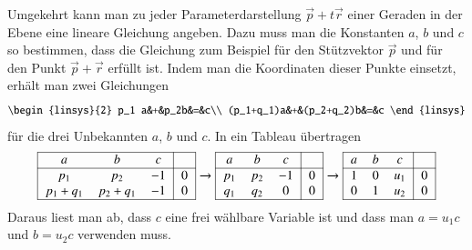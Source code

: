 Umgekehrt kann man zu jeder Parameterdarstellung
$
\vec{p} + t\vec{r}
$
einer Geraden
in der Ebene eine lineare Gleichung angeben.
Dazu muss man die Konstanten $a$, $b$ und $c$ so bestimmen,
dass die Gleichung zum Beispiel für den Stützvektor $\vec{p}$ und 
für den Punkt $\vec{p}+\vec{r}$ erfüllt ist.
Indem man die Koordinaten dieser Punkte einsetzt, erhält man
zwei Gleichungen
\[
\begin{linsys}{2}
p_1 a&+&p_2b&=&c\\
(p_1+q_1)a&+&(p_2+q_2)b&=&c
\end{linsys}
\]
für die drei Unbekannten $a$, $b$ und $c$.
In ein Tableau übertragen
\[
\begin{tabular}{|>{$}c<{$}>{$}c<{$}>{$}c<{$}|>{$}c<{$}|}
\hline
a&b&c&\\
\hline
p_1 & p_2 & -1&0\\
p_1+q_1&p_2+q_1&-1&0\\
\hline
\end{tabular}
\rightarrow
\begin{tabular}{|>{$}c<{$}>{$}c<{$}>{$}c<{$}|>{$}c<{$}|}
\hline
a&b&c&\\
\hline
p_1&p_2&-1&0\\
q_1&q_2&0&0\\
\hline
\end{tabular}
\rightarrow
\begin{tabular}{|>{$}c<{$}>{$}c<{$}>{$}c<{$}|>{$}c<{$}|}
\hline
a&b&c&\\
\hline
1&0&u_1&0\\
0&1&u_2&0\\
\hline
\end{tabular}
\]
Daraus liest man ab, dass $c$ eine frei wählbare Variable ist und dass
man $a=u_1c$ und $b=u_2c$ verwenden muss.

